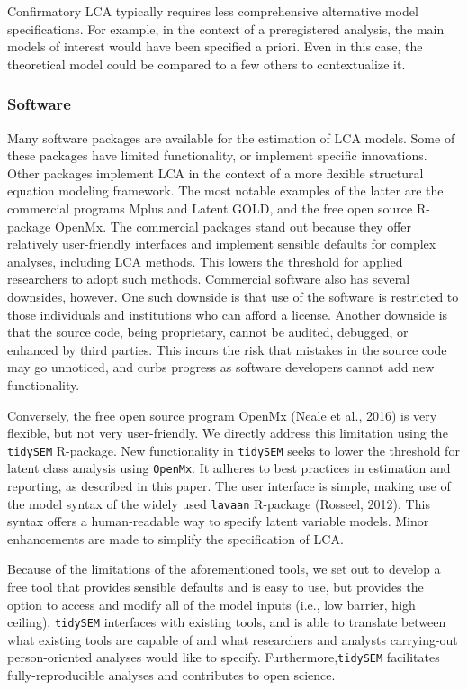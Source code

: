 \documentclass[
  ,man,floatsintext]{apa6}
\begin{document}
Confirmatory LCA typically requires less comprehensive alternative model
specifications. For example, in the context of a preregistered analysis,
the main models of interest would have been specified a priori. Even in
this case, the theoretical model could be compared to a few others to
contextualize it.

\hypertarget{software}{%
\subsubsection{Software}\label{software}}

Many software packages are available for the estimation of LCA models.
Some of these packages have limited functionality, or implement specific
innovations. Other packages implement LCA in the context of a more
flexible structural equation modeling framework. The most notable
examples of the latter are the commercial programs Mplus and Latent
GOLD, and the free open source R-package OpenMx. The commercial packages
stand out because they offer relatively user-friendly interfaces and
implement sensible defaults for complex analyses, including LCA methods.
This lowers the threshold for applied researchers to adopt such methods.
Commercial software also has several downsides, however. One such
downside is that use of the software is restricted to those individuals
and institutions who can afford a license. Another downside is that the
source code, being proprietary, cannot be audited, debugged, or enhanced
by third parties. This incurs the risk that mistakes in the source code
may go unnoticed, and curbs progress as software developers cannot add
new functionality.

Conversely, the free open source program OpenMx (Neale et al., 2016) is very flexible, but
not very user-friendly. We directly address this limitation using the
\texttt{tidySEM} R-package. New functionality in \texttt{tidySEM} seeks to lower the
threshold for latent class analysis using \texttt{OpenMx}. It adheres to best
practices in estimation and reporting, as described in this paper. The
user interface is simple, making use of the model syntax of the widely
used \texttt{lavaan} R-package (Rosseel, 2012). This syntax offers a human-readable way to
specify latent variable models. Minor enhancements are made to simplify
the specification of LCA.

Because of the limitations of the aforementioned tools, we set out to
develop a free tool that provides sensible defaults and is easy to use,
but provides the option to access and modify all of the model inputs
(i.e., low barrier, high ceiling). \texttt{tidySEM} interfaces with existing
tools, and is able to translate between what existing tools are capable
of and what researchers and analysts carrying-out person-oriented
analyses would like to specify. Furthermore,\texttt{tidySEM} facilitates
fully-reproducible analyses and contributes to open science.
\end{document}
